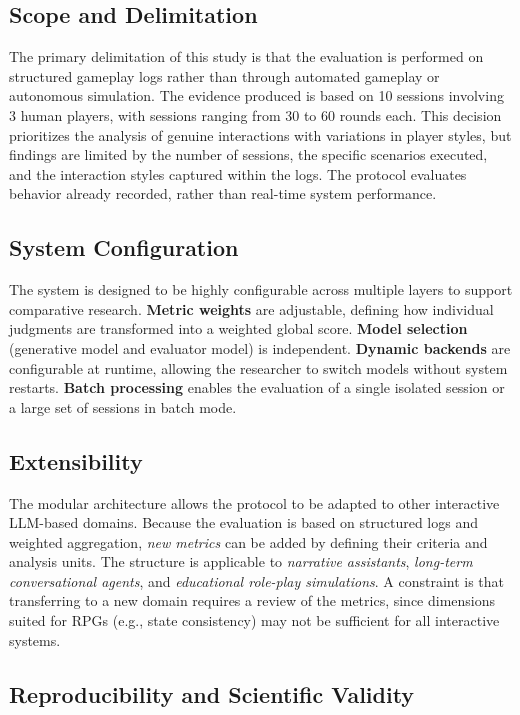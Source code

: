 \documentclass[12pt]{article}
\begin{document}
\subsection{Scope and Delimitation}

The primary delimitation of this study is that the evaluation is performed on structured gameplay logs rather than through automated gameplay or autonomous simulation. The evidence produced is based on 10 sessions involving 3 human players, with sessions ranging from 30 to 60 rounds each. This decision prioritizes the analysis of genuine interactions with variations in player styles, but findings are limited by the number of sessions, the specific scenarios executed, and the interaction styles captured within the logs. The protocol evaluates behavior already recorded, rather than real-time system performance.

\subsection{System Configuration}

The system is designed to be highly configurable across multiple layers to support comparative research. \textbf{Metric weights} are adjustable, defining how individual judgments are transformed into a weighted global score. \textbf{Model selection} (generative model and evaluator model) is independent. \textbf{Dynamic backends} are configurable at runtime, allowing the researcher to switch models without system restarts. \textbf{Batch processing} enables the evaluation of a single isolated session or a large set of sessions in batch mode.

\subsection{Extensibility}

The modular architecture allows the protocol to be adapted to other interactive LLM-based domains. Because the evaluation is based on structured logs and weighted aggregation, \textit{new metrics} can be added by defining their criteria and analysis units. The structure is applicable to \textit{narrative assistants}, \textit{long-term conversational agents}, and \textit{educational role-play simulations}. A constraint is that transferring to a new domain requires a review of the metrics, since dimensions suited for RPGs (e.g., state consistency) may not be sufficient for all interactive systems.

\subsection{Reproducibility and Scientific Validity}
\end{document}

